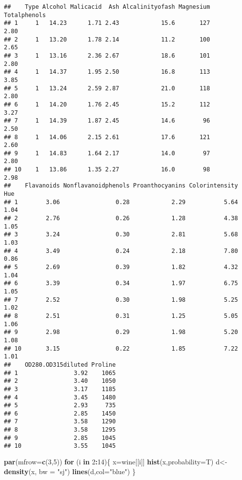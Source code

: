 \documentclass[]{article}
\newenvironment{Shaded}{\begin{snugshade}}{\end{snugshade}}
\newcommand{\ControlFlowTok}[1]{\textcolor[rgb]{0.13,0.29,0.53}{\textbf{#1}}}
\newcommand{\DataTypeTok}[1]{\textcolor[rgb]{0.13,0.29,0.53}{#1}}
\newcommand{\DecValTok}[1]{\textcolor[rgb]{0.00,0.00,0.81}{#1}}
\newcommand{\KeywordTok}[1]{\textcolor[rgb]{0.13,0.29,0.53}{\textbf{#1}}}
\newcommand{\NormalTok}[1]{#1}
\newcommand{\OperatorTok}[1]{\textcolor[rgb]{0.81,0.36,0.00}{\textbf{#1}}}
\newcommand{\StringTok}[1]{\textcolor[rgb]{0.31,0.60,0.02}{#1}}
\begin{document}
\begin{verbatim}
##    Type Alcohol Malicacid  Ash Alcalinityofash Magnesium Totalphenols
## 1     1   14.23      1.71 2.43            15.6       127         2.80
## 2     1   13.20      1.78 2.14            11.2       100         2.65
## 3     1   13.16      2.36 2.67            18.6       101         2.80
## 4     1   14.37      1.95 2.50            16.8       113         3.85
## 5     1   13.24      2.59 2.87            21.0       118         2.80
## 6     1   14.20      1.76 2.45            15.2       112         3.27
## 7     1   14.39      1.87 2.45            14.6        96         2.50
## 8     1   14.06      2.15 2.61            17.6       121         2.60
## 9     1   14.83      1.64 2.17            14.0        97         2.80
## 10    1   13.86      1.35 2.27            16.0        98         2.98
##    Flavanoids Nonflavanoidphenols Proanthocyanins Colorintensity  Hue
## 1        3.06                0.28            2.29           5.64 1.04
## 2        2.76                0.26            1.28           4.38 1.05
## 3        3.24                0.30            2.81           5.68 1.03
## 4        3.49                0.24            2.18           7.80 0.86
## 5        2.69                0.39            1.82           4.32 1.04
## 6        3.39                0.34            1.97           6.75 1.05
## 7        2.52                0.30            1.98           5.25 1.02
## 8        2.51                0.31            1.25           5.05 1.06
## 9        2.98                0.29            1.98           5.20 1.08
## 10       3.15                0.22            1.85           7.22 1.01
##    OD280.OD315diluted Proline
## 1                3.92    1065
## 2                3.40    1050
## 3                3.17    1185
## 4                3.45    1480
## 5                2.93     735
## 6                2.85    1450
## 7                3.58    1290
## 8                3.58    1295
## 9                2.85    1045
## 10               3.55    1045
\end{verbatim}

\begin{Shaded}
\begin{Highlighting}[]
\KeywordTok{par}\NormalTok{(}\DataTypeTok{mfrow=}\KeywordTok{c}\NormalTok{(}\DecValTok{3}\NormalTok{,}\DecValTok{5}\NormalTok{))}
\ControlFlowTok{for}\NormalTok{ (i }\ControlFlowTok{in} \DecValTok{2}\OperatorTok{:}\DecValTok{14}\NormalTok{)\{}
\NormalTok{  x=wine[[i]]}
\KeywordTok{hist}\NormalTok{(x,}\DataTypeTok{probability=}\NormalTok{T)}
\NormalTok{d<-}\KeywordTok{density}\NormalTok{(x, }\DataTypeTok{bw =} \StringTok{"sj"}\NormalTok{)}
\KeywordTok{lines}\NormalTok{(d,}\DataTypeTok{col=}\StringTok{"blue"}\NormalTok{)}
\NormalTok{\}}
\end{Highlighting}
\end{Shaded}
\end{document}
